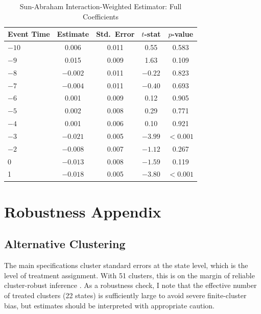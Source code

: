 \documentclass[12pt]{article}
\begin{document}
\begin{table}[H]
\centering
\caption{Sun-Abraham Interaction-Weighted Estimator: Full Coefficients}
\label{tab:sunab}
\begin{tabular}{lcccc}
\toprule
Event Time & Estimate & Std.\ Error & $t$-stat & $p$-value \\
\midrule
$-10$ & 0.006 & 0.011 & 0.55 & 0.583 \\
$-9$ & 0.015 & 0.009 & 1.63 & 0.109 \\
$-8$ & $-0.002$ & 0.011 & $-0.22$ & 0.823 \\
$-7$ & $-0.004$ & 0.011 & $-0.40$ & 0.693 \\
$-6$ & 0.001 & 0.009 & 0.12 & 0.905 \\
$-5$ & 0.002 & 0.008 & 0.29 & 0.771 \\
$-4$ & 0.001 & 0.006 & 0.10 & 0.921 \\
$-3$ & $-0.021$ & 0.005 & $-3.99$ & $<0.001$ \\
$-2$ & $-0.008$ & 0.007 & $-1.12$ & 0.267 \\
\midrule
0 & $-0.013$ & 0.008 & $-1.59$ & 0.119 \\
1 & $-0.018$ & 0.005 & $-3.80$ & $<0.001$ \\
\bottomrule
\end{tabular}
\end{table}


\section{Robustness Appendix} \label{app:robustness}

\subsection{Alternative Clustering}

The main specifications cluster standard errors at the state level, which is the level of treatment assignment. With 51 clusters, this is on the margin of reliable cluster-robust inference \citep{CameronMiller2015}. As a robustness check, I note that the effective number of treated clusters (22 states) is sufficiently large to avoid severe finite-cluster bias, but estimates should be interpreted with appropriate caution.
\end{document}
